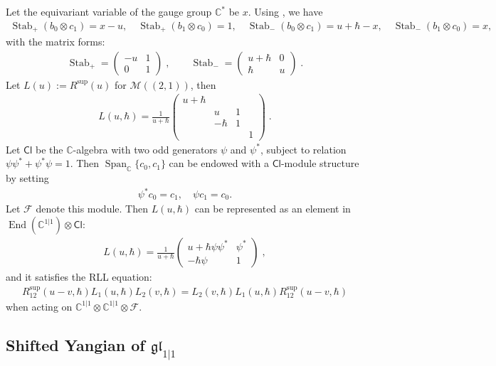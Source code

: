 \documentclass[10pt]{amsart}
\theoremstyle{definition}
\numberwithin{equation}{section}
\newcommand{\bC}{\mathbb{C}}
\newcommand{\cM}{\mathcal{M}}
\newcommand{\End}{\operatorname{End}}
\newcommand{\Span}{\operatorname{Span}}
\newcommand{\Stab}{\operatorname{Stab}}
\begin{document}
Let the equivariant variable of the gauge group $\bC^*$ be $x$. Using \cite[Cor.~4.25]{COZZ}, we have 
\begin{align*}
\Stab_+(b_0\otimes c_1)=x-u,\quad \Stab_+(b_1\otimes c_0)=1,\quad \Stab_-(b_0\otimes c_1)=u+\hbar-x,\quad \Stab_-(b_1\otimes c_0)=x,
\end{align*}
with the matrix forms:
\begin{align*}
\Stab_+=\begin{pmatrix}
-u & 1\\
0 & 1
\end{pmatrix}\;,
\qquad
\Stab_-=\begin{pmatrix}
u+\hbar & 0\\
\hbar & u
\end{pmatrix}\;.
\end{align*}
Let $L(u):=R^{\mathrm{sup}}(u)$ for $\cM((2,1))$, then 
\begin{align*}
L(u,\hbar)=\frac{1}{u+\hbar}\begin{pmatrix}
u+\hbar & & & \\
 &u & 1 & \\
 & -\hbar & 1 &\\
 & & & 1
\end{pmatrix}\;.
\end{align*}
Let $\mathsf{Cl}$ be the $\bC$-algebra with two odd generators $\psi$ and $\psi^*$, subject to relation $\psi\psi^*+\psi^*\psi=1$. Then $\Span_\bC\{c_0,c_1\}$ can be endowed with a $\mathsf{Cl}$-module structure by setting
\begin{align*}
    \psi^*c_0=c_1,\quad \psi c_1=c_0.
\end{align*}
Let $\mathcal F$ denote this module. Then $L(u,\hbar)$ can be represented as an element in $\End(\bC^{1|1})\otimes \mathsf{Cl}$:
\begin{align*}
L(u,\hbar)=\frac{1}{u+\hbar}\begin{pmatrix}
u+\hbar\psi\psi^* & \psi^*\\
-\hbar\psi & 1
\end{pmatrix}\;,
\end{align*}
and it satisfies the RLL equation:
\begin{align*}
R^{\mathrm{sup}}_{12}(u-v,\hbar)L_1(u,\hbar)L_2(v,\hbar)=L_2(v,\hbar)L_1(u,\hbar)R^{\mathrm{sup}}_{12}(u-v,\hbar)
\end{align*}
when acting on $\bC^{1|1}\otimes \bC^{1|1}\otimes\mathcal F$.

\subsection{Shifted Yangian of \texorpdfstring{$\mathfrak{gl}_{1|1}$}{gl(1|1)}}\label{sec yangian of gl(1|1)}
\end{document}
